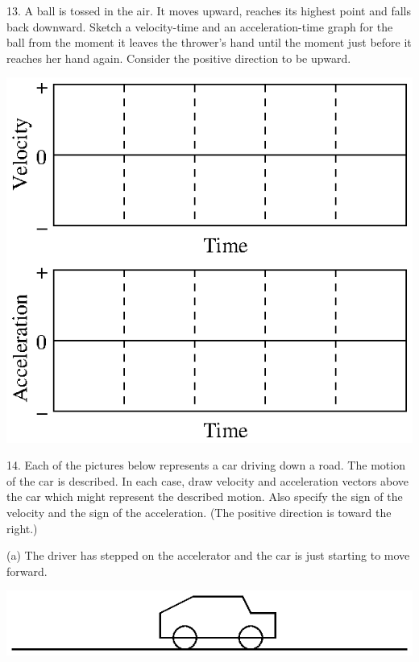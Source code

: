 13. A ball is tossed in the air. It moves upward, reaches its highest point
and falls back downward. Sketch a velocity-time and an acceleration-time graph
for the ball from the moment it leaves the thrower's hand until the moment just
before it reaches her hand again. Consider the positive direction to be upward.

\vspace{0.3cm}
{\par\centering \includegraphics{slowing/slowing_fig15.eps} \par}
\vspace{0.3cm}

14. Each of the pictures below represents a car driving down a road. The motion
of the car is described. In each case, draw velocity and acceleration vectors
above the car which might represent the described motion. Also specify the sign
of the velocity and the sign of the acceleration. (The positive direction is toward the right.)

\newpage

(a) The driver has stepped on the accelerator and the car is just starting to
move forward.

\vspace{0.3cm}
{\par\centering \includegraphics{slowing/slowing_fig16.eps} \par}
\vspace{0.3cm}

